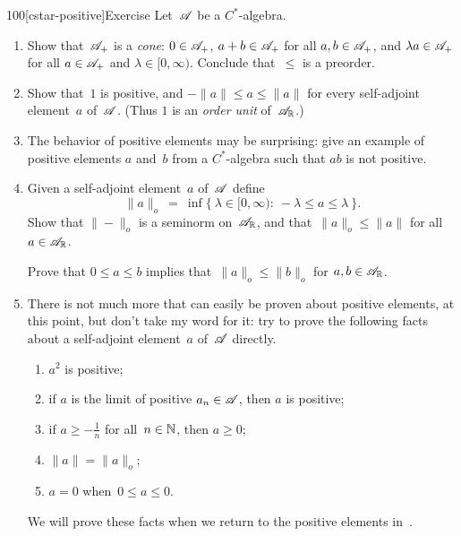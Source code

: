 \begin{parsec}{90}
\begin{point}{100}[cstar-positive]{Exercise}%
Let~$\mathscr{A}$ be a $C^*$-algebra.
\begin{enumerate}
\item
Show that~$\mathscr{A}_{+}$ is a \emph{cone}:
$0\in \mathscr{A}_{+}$,
$a+b\in \mathscr{A}_{+}$ for all $a,b\in\mathscr{A}_{+}$,
and
$\lambda a\in \mathscr{A}_{+}$  
for all $a\in \mathscr{A}_{+}$ and $\lambda\in [0,\infty)$.
Conclude that~$\leq$ is a preorder.
\item
Show that~$1$ is positive, and  $-\|a\|\leq a \leq \|a\|$
for every self-adjoint element~$a$ of~$\mathscr{A}$.
(Thus $1$ is an \emph{order unit} of~$\mathscr{A}_{\mathbb{R}}$.)
\item
The behavior of positive elements may be surprising:
give an example of positive elements $a$ and~$b$
from a $C^*$-algebra
such that $ab$ is not positive.
\item
Given a self-adjoint element~$a$ of~$\mathscr{A}$ define
\begin{equation*}
\|a\|_o \ = \ \inf\{\ \lambda\in[0,\infty)\colon \ 
-\lambda\leq a\leq \lambda\ \}.
\end{equation*}
Show that $\|-\|_o$ is a seminorm on~$\mathscr{A}_{\mathbb{R}}$,
and that~$\|a\|_o\leq \|a\|$
for all~$a\in\mathscr{A}_{\mathbb{R}}$.

Prove that $0\leq a\leq b$ implies that~$\|a\|_o\leq\|b\|_o$
for $a,b\in\mathscr{A}_{\mathbb{R}}$.

\item
There is not much more that can easily be
proven about positive elements, at this point,
but don't take my word for it:
try to prove the following facts
about a self-adjoint element~$a$ of~$\mathscr{A}$ directly.
\begin{enumerate}
\item $a^2$ is positive;
\item if $a$ is the limit of positive $a_n\in\mathscr{A}$,
then $a$ is positive;
\item if $a\geq -\frac{1}{n}$ for all~$n\in \mathbb{N}$, then $a\geq 0$;
\item  $\|a\|=\|a\|_o$;
\item $a=0$ when~$0\leq a\leq 0$.
\end{enumerate}
We will prove these facts
when we return to the positive elements in~.
\end{enumerate}
\end{point}
\end{parsec}

